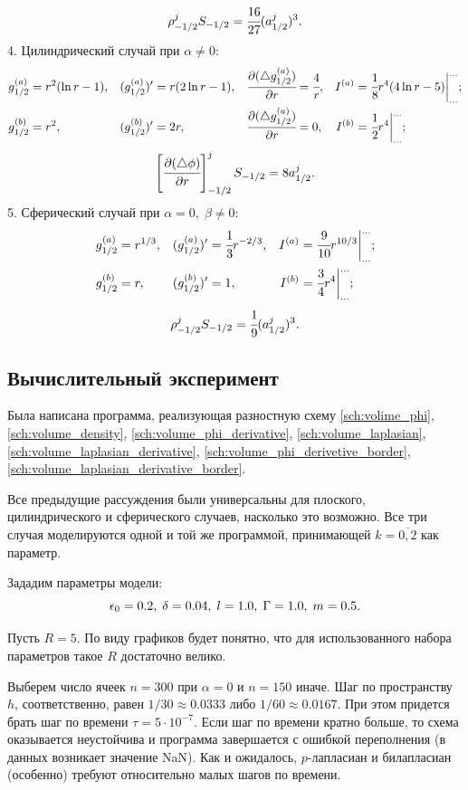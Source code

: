 $$\rho_{-1/2}^j S_{-1/2} = \cfrac{16}{27} (a_{1/2}^j)^3 {\text{.}}$$
4. Цилиндрический случай при $\alpha \neq 0$:
\begin{align*}
    g_{1/2}^{(a)} &= r^2 (\ln r - 1), & (g_{1/2}^{(a)})' &= r (2 \ln r - 1), & \cfrac{\partial (\triangle g_{1/2}^{(a)})}{\partial r} &= \cfrac{4}{r}, & I^{(a)} &= \cfrac{1}{8} r^4 (4 \ln r - 5) \bigg|_{...}^{...} {\text{;}} \\
    g_{1/2}^{(b)} &= r^2, & (g_{1/2}^{(b)})' &= 2r, & \cfrac{\partial (\triangle g_{1/2}^{(a)})}{\partial r} &= 0, & I^{(b)} &= \cfrac{1}{2} r^4 \bigg|_{...}^{...} {\text{;}}
\end{align*}
$$\left[ \cfrac{\partial (\triangle \phi)}{\partial r} \right]_{-1/2}^j S_{-1/2} = 8 a_{1/2}^j {\text{.}}$$
5. Сферический случай при $\alpha = 0, \; \beta \neq 0$:
\begin{align*}
    g_{1/2}^{(a)} &= r^{1/3}, & (g_{1/2}^{(a)})' &= \cfrac{1}{3} r^{-2/3}, & I^{(a)} &= \cfrac{9}{10} r^{10/3} \bigg|_{...}^{...}  {\text{;}} \\
    g_{1/2}^{(b)} &= r, & (g_{1/2}^{(b)})' &= 1, & I^{(b)} &= \cfrac{3}{4} r^4 \bigg|_{...}^{...} {\text{;}}
\end{align*}
$$\rho_{-1/2}^j S_{-1/2} = \cfrac{1}{9} (a_{1/2}^j)^3 {\text{.}}$$
\endgroup


\subsection{Вычислительный эксперимент}

Была написана программа, реализующая разностную схему \eqref{sch:volime_phi}, \eqref{sch:volume_density}, \eqref{sch:volume_phi_derivative}, \eqref{sch:volume_laplasian}, \eqref{sch:volume_laplasian_derivative}, \eqref{sch:volume_phi_derivetive_border}, \eqref{sch:volume_laplasian_derivative_border}.

Все предыдущие рассуждения были универсальны для плоского, цилиндрического и сферического случаев, насколько это возможно. Все три случая моделируются одной и той же программой, принимающей $k = \overline{0, 2}$ как параметр.

Зададим параметры модели:
$$\epsilon_0 = 0.2, \; \delta = 0.04, \; l = 1.0, \; \Gamma = 1.0, \; m = 0.5 {\text{.}}$$

Пусть $R = 5$. По виду графиков будет понятно, что для использованного набора параметров такое $R$ достаточно велико.

Выберем число ячеек $n = 300$ при $\alpha = 0$ и $n = 150$ иначе. Шаг по пространству~$h$, соответственно, равен $1/30 \approx 0.0333$ либо $1/60 \approx 0.0167$. При этом придется брать шаг по времени $\tau = 5 \cdot 10^{-7}$. Если шаг по времени кратно больше, то схема оказывается неустойчива и программа завершается с ошибкой переполнения (в данных возникает значение NaN). Как и ожидалось, $p$-лапласиан и билапласиан (особенно) требуют относительно малых шагов по времени.

